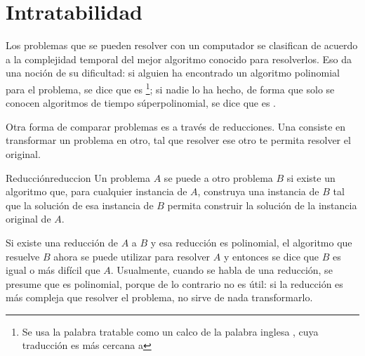 \section{Intratabilidad}

Los problemas que se pueden resolver con un computador se clasifican de acuerdo a la complejidad temporal del mejor algoritmo conocido para resolverlos. Eso da una noción de su dificultad: si alguien ha encontrado un algoritmo polinomial para el problema, se dice que es \footnote{Se usa la palabra tratable como un calco de la palabra inglesa , cuya traducción es más cercana a }; si nadie lo ha hecho, de forma que solo se conocen algoritmos de tiempo súperpolinomial, se dice que es .

Otra forma de comparar problemas es a través de reducciones. Una  consiste en transformar un problema en otro, tal que resolver ese otro te permita resolver el original.
\begin{definicion}{Reducción}{reduccion}
  Un problema \(A\) se puede  a otro problema \(B\) si existe un algoritmo que, para cualquier instancia de \(A\), construya una instancia de \(B\) tal que la solución de esa instancia de \(B\) permita construir la solución de la instancia original de \(A\).
\end{definicion}
Si existe una reducción de \(A\) a \(B\) y esa reducción es polinomial, el algoritmo que resuelve \(B\) ahora se puede utilizar para resolver \(A\) y entonces se dice que \(B\) es igual o más difícil que \(A\). Usualmente, cuando se habla de una reducción, se presume que es polinomial, porque de lo contrario no es útil: si la reducción es más compleja que resolver el problema, no sirve de nada transformarlo.

